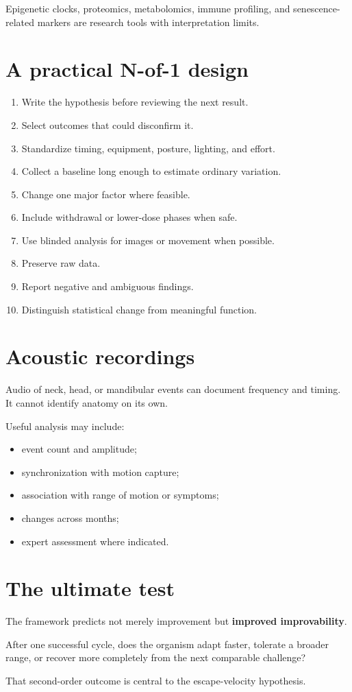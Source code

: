 Epigenetic clocks, proteomics, metabolomics, immune profiling, and senescence-related markers are research tools with interpretation limits.

\section{A practical N-of-1 design}

\begin{enumerate}
\def\labelenumi{\arabic{enumi}.}
\tightlist
\item
  Write the hypothesis before reviewing the next result.
\item
  Select outcomes that could disconfirm it.
\item
  Standardize timing, equipment, posture, lighting, and effort.
\item
  Collect a baseline long enough to estimate ordinary variation.
\item
  Change one major factor where feasible.
\item
  Include withdrawal or lower-dose phases when safe.
\item
  Use blinded analysis for images or movement when possible.
\item
  Preserve raw data.
\item
  Report negative and ambiguous findings.
\item
  Distinguish statistical change from meaningful function.
\end{enumerate}

\section{Acoustic recordings}

Audio of neck, head, or mandibular events can document frequency and timing. It cannot identify anatomy on its own.

Useful analysis may include:

\begin{itemize}
\tightlist
\item
  event count and amplitude;
\item
  synchronization with motion capture;
\item
  association with range of motion or symptoms;
\item
  changes across months;
\item
  expert assessment where indicated.
\end{itemize}

\section{The ultimate test}

The framework predicts not merely improvement but \textbf{improved improvability}.

After one successful cycle, does the organism adapt faster, tolerate a broader range, or recover more completely from the next comparable challenge?

That second-order outcome is central to the escape-velocity hypothesis.
